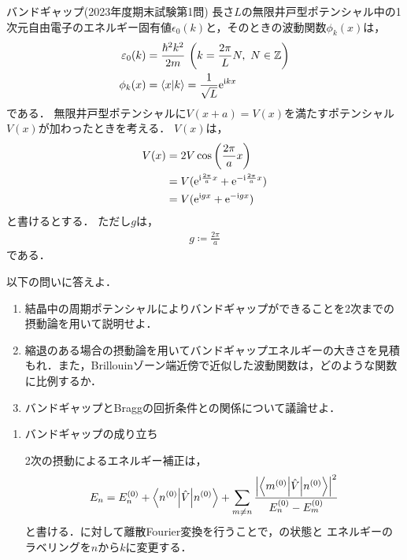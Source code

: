 \documentclass{report}
\begin{document}
  \begin{myex}{バンドギャップ(2023年度期末試験第1問)}{}
    長さ$L$の無限井戸型ポテンシャル中の1次元自由電子のエネルギー固有値$\epsilon_0(k)$と，そのときの波動関数$\phi_k(x)$は，
    \begin{align}
      \varepsilon_0(k) &= \frac{\hbar^2k^2}{2m}\ \qty(k = \frac{2\pi}{L}N,\ N\in\mathbb{Z}) \\ 
      \phi_k(x) &= \braket{x}{k} = \frac{1}{\sqrt{L}}\mathrm{e}^{\mathrm{i} kx} 
    \end{align}
    である．
    無限井戸型ポテンシャルに$V(x + a) = V(x)$を満たすポテンシャル$V(x)$が加わったときを考える．
    $V(x)$は，
    \begin{align}
      V(x)& = 2V\cos\qty(\frac{2\pi}{a}x)\\
      & = V(\mathrm{e}^{\mathrm{i}\frac{2\pi}{a}x} + \mathrm{e}^{-\mathrm{i}\frac{2\pi}{a}x})\\
      & = V(\mathrm{e}^{\mathrm{i} gx} + \mathrm{e}^{-\mathrm{i} gx})
    \end{align}
    と書けるとする．
    ただし$g$は，
    \begin{align}
      g\coloneqq \frac{2\pi}{a}\label{wave-number-g-def}
    \end{align}
    である．
    \par
    以下の問いに答えよ．
    \begin{enumerate}
      \item 結晶中の周期ポテンシャルによりバンドギャップができることを2次までの摂動論を用いて説明せよ．
      \item 縮退のある場合の摂動論を用いてバンドギャップエネルギーの大きさを見積もれ．また，Brillouinゾーン端近傍で近似した波動関数は，どのような関数に比例するか．
      \item バンドギャップとBraggの回折条件との関係について議論せよ．
    \end{enumerate}
    \tcblower
    \begin{enumerate}
      \item バンドギャップの成り立ち \par
        2次の摂動によるエネルギー補正は，
        \begin{align}
          E_n = E_n^{(0)} + \mel**{n^{(0)}}{\hat{V}}{n^{(0)}} + \sum_{m\neq n}\frac{\abs{\mel**{m^{(0)}}{\hat{V}}{n^{(0)}}}^2}{E_n^{(0)} - E_m^{(0)}} \label{2nd-order-perturbation-eigenvalue-re}
        \end{align}
        と書ける．に対して離散Fourier変換を行うことで，の状態と
        エネルギーのラベリングを$n$から$k$に変更する．

\end{enumerate}
\end{myex}
\end{document}
